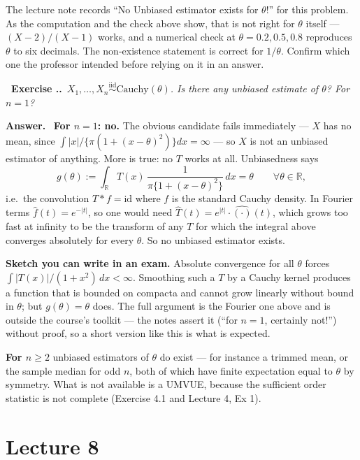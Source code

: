 \documentclass[11pt]{article}
\newcommand{\R}{\mathbb{R}}
\newcommand{\iid}{\overset{\text{iid}}{\sim}}
\newcounter{exc}[section]
\newenvironment{exc}[1]{\medskip\refstepcounter{exc}%
  \noindent\textbf{\color{ForestGreen}\raisebox{0.5pt}{\scriptsize$\blacksquare$}\ Exercise \thesection.\theexc.}\ \textit{#1}\par\nopagebreak}{\par}
\newcommand{\ans}{\smallskip\noindent\textbf{Answer.}\ }
\begin{document}
\begin{flagbox}
The lecture note records ``No Unbiased estimator exists for $\theta$!'' for this problem.
As the computation and the check above show, that is not right for $\theta$ itself ---
$(X-2)/(X-1)$ works, and a numerical check at $\theta=0.2,0.5,0.8$ reproduces $\theta$ to six
decimals. The non-existence statement is correct for $1/\theta$. Confirm which one the
professor intended before relying on it in an answer.
\end{flagbox}

\begin{exc}{$X_1,\dots,X_n\iid\mathrm{Cauchy}(\theta)$. Is there any unbiased estimate of
$\theta$? For $n=1$?}
\end{exc}
\ans
\textbf{For $n=1$: no.} The obvious candidate fails immediately --- $X$ has no mean, since
$\int|x|/\{\pi(1+(x-\theta)^2)\}dx=\infty$ --- so $X$ is not an unbiased estimator of
anything. More is true: no $T$ works at all. Unbiasedness says
\[
g(\theta):=\int_{\R}T(x)\,\frac{1}{\pi\{1+(x-\theta)^2\}}\,dx=\theta\qquad\forall\theta\in\R,
\]
i.e.\ the convolution $T*f=\mathrm{id}$ where $f$ is the standard Cauchy density. In Fourier
terms $\widehat f(t)=e^{-|t|}$, so one would need $\widehat T(t)=e^{|t|}\cdot\widehat{(\cdot)}(t)$,
which grows too fast at infinity to be the transform of any $T$ for which the integral above
converges absolutely for every $\theta$. So no unbiased estimator exists.

\textbf{Sketch you can write in an exam.} Absolute convergence for all $\theta$ forces
$\int|T(x)|/(1+x^2)\,dx<\infty$. Smoothing such a $T$ by a Cauchy kernel produces a function
that is bounded on compacta and cannot grow linearly without bound in $\theta$; but $g(\theta)=\theta$
does. The full argument is the Fourier one above and is outside the course's toolkit --- the
notes assert it (``for $n=1$, certainly not!'') without proof, so a short version like this is
what is expected.

\textbf{For $n\ge2$} unbiased estimators of $\theta$ do exist --- for instance a trimmed mean,
or the sample median for odd $n$, both of which have finite expectation equal to $\theta$ by
symmetry. What is not available is a UMVUE, because the sufficient order statistic is not
complete (Exercise 4.1 and Lecture 4, Ex 1).

\section{Lecture 8}
\end{document}
